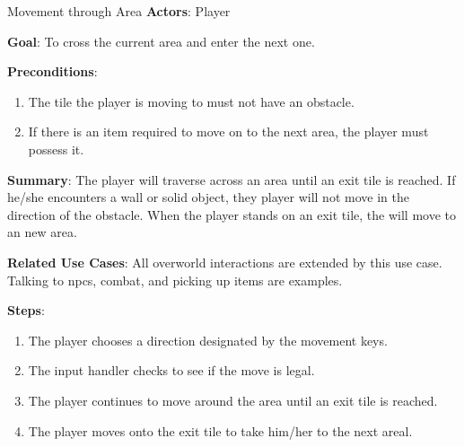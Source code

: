 \documentclass[12pt]{report}
\begin{document}
    \begin{subsection}{Movement through Area}
      \textbf{Actors}:
      Player

      \textbf{Goal}:
      To cross the current area and enter the next one.

      \textbf{Preconditions}:
      \begin{enumerate}
        \item The tile the player is moving to must not have an obstacle. 
        \item If there is an item required to move on to the next area, the player must possess it.
      \end{enumerate}

      \textbf{Summary}:
      The player will traverse across an area until an exit tile is reached. If he/she encounters a wall or solid object, they player will not move in the direction of the obstacle. When the player stands on an exit tile, the will move to an new area.

      \textbf{Related Use Cases}:
      All overworld interactions are extended by this use case. Talking to npcs, combat, and picking up items are examples.

      \textbf{Steps}:
      \begin{enumerate}
        \item The player chooses a direction designated by the movement keys.
        \item The input handler checks to see if the move is legal.
        \item The player continues to move around the area until an exit tile is reached.
        \item The player moves onto the exit tile to take him/her to the next areal.
      \end{enumerate}
    \end{subsection}
    
\end{document}
